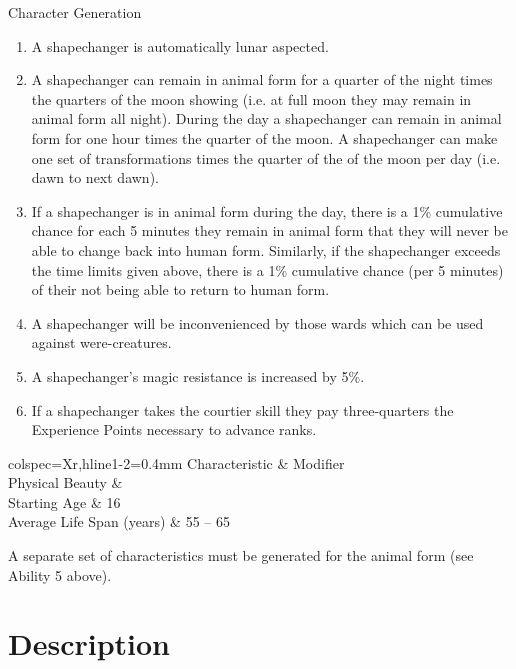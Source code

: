 \begin{Chapter}{Character Generation}
\begin{enumerate}
\item A shapechanger is automatically lunar aspected.

\item A shapechanger can remain in animal form for a quarter of the
  night times the quarters of the moon showing (i.e. at full moon they
  may remain in animal form all night).  During the day a shapechanger
  can remain in animal form for one hour times the quarter of the
  moon.  A shapechanger can make one set of transformations times the
  quarter of the of the moon per day (i.e. dawn to next dawn).

\item If a shapechanger is in animal form during the day, there is a
  1\% cumulative chance for each 5 minutes they remain in animal form
  that they will never be able to change back into human form.
  Similarly, if the shapechanger exceeds the time limits given above,
  there is a 1\% cumulative chance (per 5 minutes) of their not being
  able to return to human form.

\item A shapechanger will be inconvenienced by those wards which can
  be used against were-creatures.

\item A shapechanger’s magic resistance is increased by 5\%.

\item If a shapechanger takes the courtier skill they pay
  three-quarters the Experience Points necessary to advance ranks.

\end{enumerate}

\smallskip

\begin{dqtblr}{colspec={Xr},hline{1-2}={0.4mm}}
Characteristic			& Modifier \\
Physical Beauty			&  \\
Starting Age			& 16 \pl  \\
Average Life Span (years)	& 55 -- 65 \\
\end{dqtblr}

A separate set of characteristics must be generated for the animal
form (see Ability 5 above).

\section{Description}
\label{description}


\end{Chapter}
